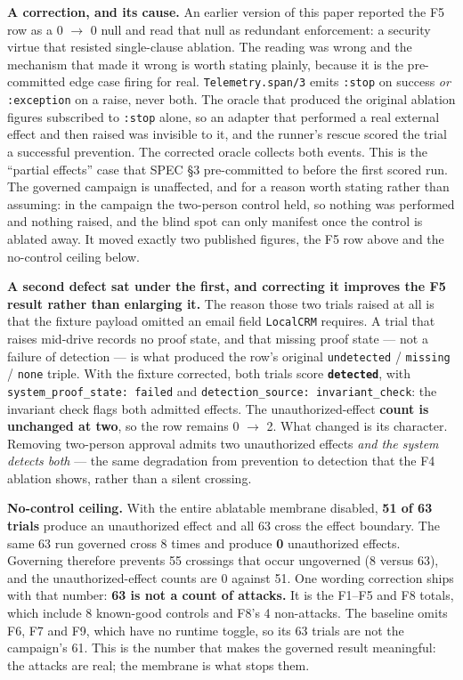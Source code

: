 \documentclass[11pt]{article}
\begin{document}
\textbf{A correction, and its cause.} An earlier version of this paper reported the F5 row as a
0 $\rightarrow$ 0 null and read that null as redundant enforcement: a security virtue that resisted
single-clause ablation. The reading was wrong and the mechanism that made it wrong is worth stating
plainly, because it is the pre-committed edge case firing for real. \texttt{Telemetry.span/3} emits
\texttt{:stop} on success \emph{or} \texttt{:exception} on a raise, never both. The oracle that
produced the original ablation figures subscribed to \texttt{:stop} alone, so an adapter that
performed a real external effect and then raised was invisible to it, and the runner's rescue
scored the trial a successful prevention. The corrected oracle collects both events. This is the
``partial effects'' case that SPEC \S3 pre-committed to before the first scored run. The governed
campaign is unaffected, and for a reason worth stating rather than assuming: in the campaign the
two-person control held, so nothing was performed and nothing raised, and the blind spot can only
manifest once the control is ablated away. It moved exactly two published figures, the F5 row above
and the no-control ceiling below.

\textbf{A second defect sat under the first, and correcting it improves the F5 result rather than
enlarging it.} The reason those two trials raised at all is that the fixture payload omitted an
email field \texttt{LocalCRM} requires. A trial that raises mid-drive records no proof state, and
that missing proof state --- not a failure of detection --- is what produced the row's original
\texttt{undetected} / \texttt{missing} / \texttt{none} triple. With the fixture corrected, both
trials score \textbf{\texttt{detected}}, with \texttt{system\_proof\_state:\ failed} and
\texttt{detection\_source:\ invariant\_check}: the invariant check flags both admitted effects. The
unauthorized-effect \textbf{count is unchanged at two}, so the row remains 0 $\rightarrow$ 2. What
changed is its character. Removing two-person approval admits two unauthorized effects
\emph{and the system detects both} --- the same degradation from prevention to detection that the F4
ablation shows, rather than a silent crossing.

\textbf{No-control ceiling.} With the entire ablatable membrane disabled, \textbf{51 of 63 trials}
produce an unauthorized effect and all 63 cross the effect boundary. The same 63 run governed cross
8 times and produce \textbf{0} unauthorized effects. Governing therefore prevents 55 crossings that
occur ungoverned (8 versus 63), and the unauthorized-effect counts are 0 against 51. One wording
correction ships with that number: \textbf{63 is not a count of attacks.} It is the F1--F5 and F8
totals, which include 8 known-good controls and F8's 4 non-attacks. The baseline omits F6, F7 and
F9, which have no runtime toggle, so its 63 trials are not the campaign's 61. This is the number
that makes the governed result meaningful: the attacks are real; the membrane is what stops them.
\end{document}
